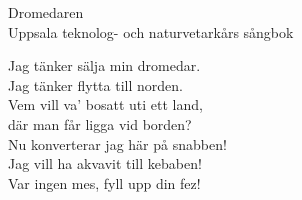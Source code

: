 {\Large Dromedaren}\\{\tiny  Uppsala teknolog- och naturvetarkårs sångbok}
  \begin{vers}
Jag tänker sälja min dromedar.\\ 
Jag tänker flytta till norden. \\
Vem vill va’ bosatt uti ett land, \\
där man får ligga vid borden? \\
Nu konverterar jag här på snabben! \\
Jag vill ha akvavit till kebaben! \\
Var ingen mes, fyll upp din fez! \\
\end{vers}
 